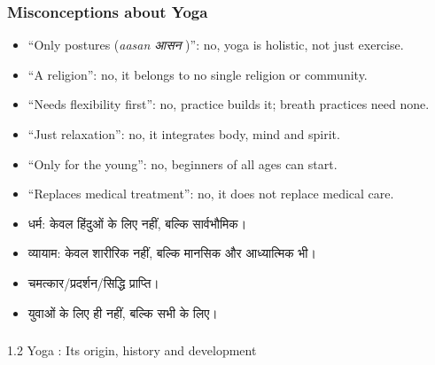 \begin{frame}[fragile]\frametitle{Misconceptions about Yoga}

      \begin{itemize}
		\item ``Only postures (\textit{aasan आसन })'': no, yoga is holistic, not just exercise.
		\item ``A religion'': no, it belongs to no single religion or community.
		\item ``Needs flexibility first'': no, practice builds it; breath practices need none.
		\item ``Just relaxation'': no, it integrates body, mind and spirit.
		\item ``Only for the young'': no, beginners of all ages can start.
		\item ``Replaces medical treatment'': no, it does not replace medical care.
		\item  धर्म: केवल हिंदुओं के लिए नहीं, बल्कि सार्वभौमिक।
		\item  व्यायाम: केवल शारीरिक नहीं, बल्कि मानसिक और आध्यात्मिक भी।
		\item  चमत्कार/प्रदर्शन/सिद्धि प्राप्ति।
		\item  युवाओं के लिए ही नहीं, बल्कि सभी के लिए।		
	  \end{itemize}

\end{frame}


\begin{frame}[fragile]\frametitle{}
\begin{center}
{\Large 1.2 Yoga : Its origin, history and development}
\end{center}
\end{frame}



